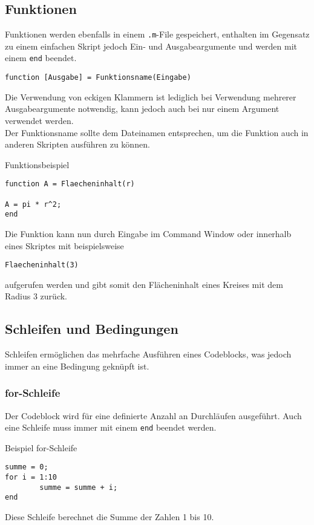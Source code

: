         \subsection{Funktionen}
        Funktionen werden ebenfalls in einem \texttt{.m}-File gespeichert, enthalten im Gegensatz zu einem einfachen Skript jedoch Ein- und Ausgabeargumente und werden mit einem \texttt{end} beendet.
        \begin{center}
                \texttt{function [Ausgabe] = Funktionsname(Eingabe)}     
        \end{center}
                Die Verwendung von eckigen Klammern ist lediglich bei Verwendung mehrerer Ausgabeargumente notwendig, kann jedoch auch bei nur einem Argument verwendet werden. \\
                Der Funktionsname sollte dem Dateinamen entsprechen, um die Funktion auch in anderen Skripten ausführen zu können.
                \begin{Codelösung}{Funktionsbeispiel}
                        \begin{lstlisting}
function A = Flaecheninhalt(r)

A = pi * r^2;
end       
                        \end{lstlisting}

                \end{Codelösung}
                \noindent
                Die Funktion kann nun durch Eingabe im Command Window oder innerhalb eines Skriptes mit beispielsweise
                \begin{center}
                        \texttt{Flaecheninhalt(3)}
                \end{center}
                aufgerufen werden und gibt somit den Flächeninhalt eines Kreises mit dem Radius 3 zurück.
        \subsection{Schleifen und Bedingungen}
                Schleifen ermöglichen das mehrfache Ausführen eines Codeblocks, was jedoch immer an eine Bedingung geknüpft ist.
                \subsubsection*{for-Schleife}
                Der Codeblock wird für eine definierte Anzahl an Durchläufen ausgeführt. Auch eine Schleife muss immer mit einem \texttt{end} beendet werden.
                \begin{Codelösung}{Beispiel for-Schleife}
                        \begin{lstlisting}
summe = 0;
for i = 1:10
        summe = summe + i;
end
                        \end{lstlisting}
                \end{Codelösung}
        \noindent Diese Schleife berechnet die Summe der Zahlen 1 bis 10.
